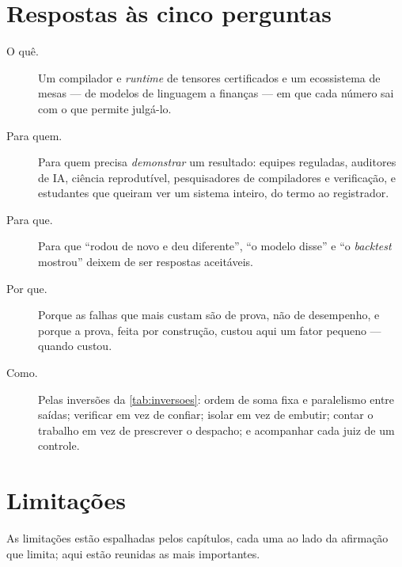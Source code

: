 \section{Respostas às cinco perguntas}

\begin{description}
  \item[O quê.] Um compilador e \textit{runtime} de tensores certificados e um ecossistema de mesas --- de modelos de linguagem a finanças --- em que cada número sai com o que permite julgá-lo.
  \item[Para quem.] Para quem precisa \emph{demonstrar} um resultado: equipes reguladas, auditores de IA, ciência reprodutível, pesquisadores de compiladores e verificação, e estudantes que queiram ver um sistema inteiro, do termo ao registrador.
  \item[Para que.] Para que ``rodou de novo e deu diferente'', ``o modelo disse'' e ``o \textit{backtest} mostrou'' deixem de ser respostas aceitáveis.
  \item[Por que.] Porque as falhas que mais custam são de prova, não de desempenho, e porque a prova, feita por construção, custou aqui um fator pequeno --- quando custou.
  \item[Como.] Pelas inversões da \autoref{tab:inversoes}: ordem de soma fixa e paralelismo entre saídas; verificar em vez de confiar; isolar em vez de embutir; contar o trabalho em vez de prescrever o despacho; e acompanhar cada juiz de um controle.
\end{description}

\section{Limitações}

As limitações estão espalhadas pelos capítulos, cada uma ao lado da afirmação que limita; aqui estão reunidas as mais importantes.

